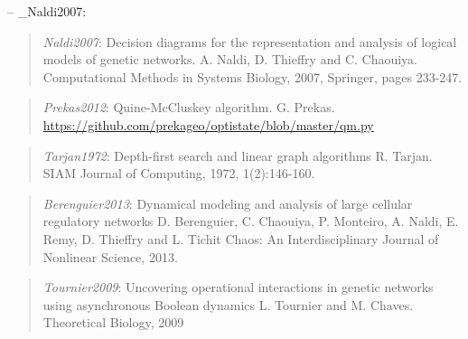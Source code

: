 \documentclass[letterpaper,10pt,english]{sphinxmanual}
\begin{document}
-- \_Naldi2007:
\begin{quote}

\emph{Naldi2007}:
Decision diagrams for the representation and analysis of logical models of genetic networks.
A. Naldi, D. Thieffry and C. Chaouiya.
Computational Methods in Systems Biology, 2007, Springer, pages 233-247.
\end{quote}
\label{Bibliography:prekas2012}\begin{quote}

\emph{Prekas2012}:
Quine-McCluskey algorithm.
G. Prekas.
\href{https://github.com/prekageo/optistate/blob/master/qm.py}{https://github.com/prekageo/optistate/blob/master/qm.py}
\end{quote}
\label{Bibliography:tarjan1972}\begin{quote}

\emph{Tarjan1972}:
Depth-first search and linear graph algorithms
R. Tarjan.
SIAM Journal of Computing, 1972, 1(2):146-160.
\end{quote}
\label{Bibliography:berenguier2013}\begin{quote}

\emph{Berenguier2013}:
Dynamical modeling and analysis of large cellular regulatory networks
D. Berenguier, C. Chaouiya, P. Monteiro, A. Naldi, E. Remy, D. Thieffry and L. Tichit
Chaos: An Interdisciplinary Journal of Nonlinear Science, 2013.
\end{quote}
\label{Bibliography:tournier2009}\begin{quote}

\emph{Tournier2009}:
Uncovering operational interactions in genetic networks using asynchronous Boolean dynamics
L. Tournier and M. Chaves.
Theoretical Biology, 2009
\end{quote}



\renewcommand{\indexname}{Index}
\printindex
\end{document}
